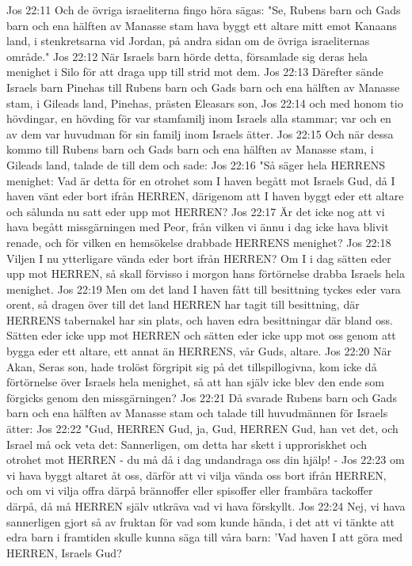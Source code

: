Jos 22:11  Och de övriga israeliterna fingo höra sägas: "Se, Rubens barn och Gads barn och ena hälften av Manasse stam hava byggt ett altare mitt emot Kanaans land, i stenkretsarna vid Jordan, på andra sidan om de övriga israeliternas område."
Jos 22:12  När Israels barn hörde detta, församlade sig deras hela menighet i Silo för att draga upp till strid mot dem.
Jos 22:13  Därefter sände Israels barn Pinehas till Rubens barn och Gads barn och ena hälften av Manasse stam, i Gileads land, Pinehas, prästen Eleasars son,
Jos 22:14  och med honom tio hövdingar, en hövding för var stamfamilj inom Israels alla stammar; var och en av dem var huvudman för sin familj inom Israels ätter.
Jos 22:15  Och när dessa kommo till Rubens barn och Gads barn och ena hälften av Manasse stam, i Gileads land, talade de till dem och sade:
Jos 22:16  "Så säger hela HERRENS menighet: Vad är detta för en otrohet som I haven begått mot Israels Gud, då I haven vänt eder bort ifrån HERREN, därigenom att I haven byggt eder ett altare och sålunda nu satt eder upp mot HERREN?
Jos 22:17  Är det icke nog att vi hava begått missgärningen med Peor, från vilken vi ännu i dag icke hava blivit renade, och för vilken en hemsökelse drabbade HERRENS menighet?
Jos 22:18  Viljen I nu ytterligare vända eder bort ifrån HERREN? Om I i dag sätten eder upp mot HERREN, så skall förvisso i morgon hans förtörnelse drabba Israels hela menighet.
Jos 22:19  Men om det land I haven fått till besittning tyckes eder vara orent, så dragen över till det land HERREN har tagit till besittning, där HERRENS tabernakel har sin plats, och haven edra besittningar där bland oss. Sätten eder icke upp mot HERREN och sätten eder icke upp mot oss genom att bygga eder ett altare, ett annat än HERRENS, vår Guds, altare.
Jos 22:20  När Akan, Seras son, hade trolöst förgripit sig på det tillspillogivna, kom icke då förtörnelse över Israels hela menighet, så att han själv icke blev den ende som förgicks genom den missgärningen?
Jos 22:21  Då svarade Rubens barn och Gads barn och ena hälften av Manasse stam och talade till huvudmännen för Israels ätter:
Jos 22:22  "Gud, HERREN Gud, ja, Gud, HERREN Gud, han vet det, och Israel må ock veta det: Sannerligen, om detta har skett i upproriskhet och otrohet mot HERREN - du må då i dag undandraga oss din hjälp! -
Jos 22:23  om vi hava byggt altaret åt oss, därför att vi vilja vända oss bort ifrån HERREN, och om vi vilja offra därpå brännoffer eller spisoffer eller frambära tackoffer därpå, då må HERREN själv utkräva vad vi hava förskyllt.
Jos 22:24  Nej, vi hava sannerligen gjort så av fruktan för vad som kunde hända, i det att vi tänkte att edra barn i framtiden skulle kunna säga till våra barn: 'Vad haven I att göra med HERREN, Israels Gud?
